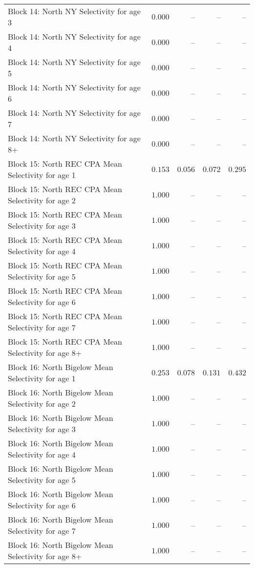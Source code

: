 \documentclass[
]{article}
\begin{document}
\begin{landscape}
\begin{longtable}[t]{lrrrr}
Block 14: North NY Selectivity for age 3 & $0.000$ & -- & -- & --\\
\addlinespace
Block 14: North NY Selectivity for age 4 & $0.000$ & -- & -- & --\\
Block 14: North NY Selectivity for age 5 & $0.000$ & -- & -- & --\\
Block 14: North NY Selectivity for age 6 & $0.000$ & -- & -- & --\\
Block 14: North NY Selectivity for age 7 & $0.000$ & -- & -- & --\\
Block 14: North NY Selectivity for age 8+ & $0.000$ & -- & -- & --\\
\addlinespace
Block 15: North REC CPA Mean Selectivity for age 1 & $0.153$ & $0.056$ & $0.072$ & $0.295$\\
Block 15: North REC CPA Mean Selectivity for age 2 & $1.000$ & -- & -- & --\\
Block 15: North REC CPA Mean Selectivity for age 3 & $1.000$ & -- & -- & --\\
Block 15: North REC CPA Mean Selectivity for age 4 & $1.000$ & -- & -- & --\\
Block 15: North REC CPA Mean Selectivity for age 5 & $1.000$ & -- & -- & --\\
\addlinespace
Block 15: North REC CPA Mean Selectivity for age 6 & $1.000$ & -- & -- & --\\
Block 15: North REC CPA Mean Selectivity for age 7 & $1.000$ & -- & -- & --\\
Block 15: North REC CPA Mean Selectivity for age 8+ & $1.000$ & -- & -- & --\\
Block 16: North Bigelow Mean Selectivity for age 1 & $0.253$ & $0.078$ & $0.131$ & $0.432$\\
Block 16: North Bigelow Mean Selectivity for age 2 & $1.000$ & -- & -- & --\\
\addlinespace
Block 16: North Bigelow Mean Selectivity for age 3 & $1.000$ & -- & -- & --\\
Block 16: North Bigelow Mean Selectivity for age 4 & $1.000$ & -- & -- & --\\
Block 16: North Bigelow Mean Selectivity for age 5 & $1.000$ & -- & -- & --\\
Block 16: North Bigelow Mean Selectivity for age 6 & $1.000$ & -- & -- & --\\
Block 16: North Bigelow Mean Selectivity for age 7 & $1.000$ & -- & -- & --\\
\addlinespace
Block 16: North Bigelow Mean Selectivity for age 8+ & $1.000$ & -- & -- & --\\

\end{longtable}
\end{landscape}
\end{document}

